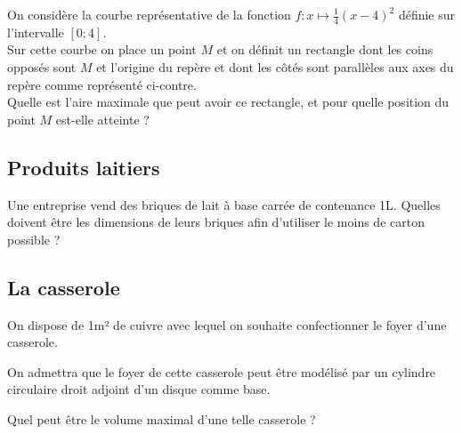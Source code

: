 \documentclass[oneside,12pt]{article}          %
\begin{document}
\begin{minipage}{0.5\linewidth}
On considère la courbe représentative de la fonction $f:x\mapsto\frac{1}{4}(x-4)^2$ définie sur l'intervalle $[0;4]$.\\

Sur cette courbe on place un point $M$ et on définit un rectangle dont les coins opposés sont $M$ et l'origine du repère et dont les côtés sont parallèles aux axes du repère comme représenté ci-contre.\\

Quelle est l'aire maximale que peut avoir ce rectangle, et pour quelle position du point $M$ est-elle atteinte ?
\end{minipage}
\begin{minipage}{0.5\linewidth}
\end{minipage}



\subsection{Produits laitiers}
Une entreprise vend des briques de lait à base carrée de contenance 1L. Quelles doivent être les dimensions de leurs briques afin d'utiliser le moins de carton possible ?



\subsection{La casserole}
On dispose de 1m² de cuivre avec lequel on souhaite confectionner le foyer d'une casserole.

On admettra que le foyer de cette casserole peut être modélisé par un cylindre circulaire droit adjoint d'un disque comme base.

Quel peut être le volume maximal d'une telle casserole ?
\end{document}
